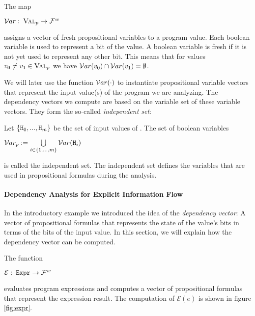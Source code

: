 \begin{definition}
    The map
    \begin{center}
        $\mathcal{V}ar: \: \textsc{Val}_p \to  \mathcal{F}^w$
    \end{center}
     assigns a vector of fresh propositional variables to a program value. Each boolean variable is used to represent a bit of the value. A boolean variable is fresh if it is not yet used to represent any other bit. This means that for values $v_0 \neq v_1 \in \textsc{Val}_p$ we have $\mathcal{V}ar(v_0) \cap \mathcal{V}ar(v_1) = \emptyset$.
\end{definition}
We will later use the function $\mathcal{V}ar(\cdot)$ to instantiate propositional variable vectors that represent the input value(s) of the program we are analyzing. The dependency vectors we compute are based on the variable set of these variable vectors. They form the so-called \emph{independent set}:

\begin{definition}
    Let $\{ \mathtt{H}_0, ..., \mathtt{H}_m \}$ be the set of input values of \pp. The set of boolean variables
    \begin{center}
        $\mathcal{V}ar_p := \bigcup\limits_{i \in \{1,..., m\}} \mathcal{V}ar(\mathtt{H}_i)$
    \end{center}
    is called the independent set. The independent set defines the variables that are used in propositional formulas during the analysis.
\end{definition}

\paragraph{Dependency Analysis for Explicit Information Flow}

In the introductory example we introduced the idea of the \emph{dependency vector}: A vector of propositional formulas that represents the state of the value's bits in terms of the bits of the input value. In this section, we will explain how the dependency vector can be computed.

\begin{definition}\label{def:exprEval}
     The function
    \begin{center}
        $\mathcal{E}: \: \mathtt{Expr} \to \mathcal{F}^w$
    \end{center}
    evaluates program expressions and computes a vector of propositional formulas that represent the expression result. The computation of $\mathcal{E}(e)$ is shown in figure \ref{fig:expr}.
\end{definition}

